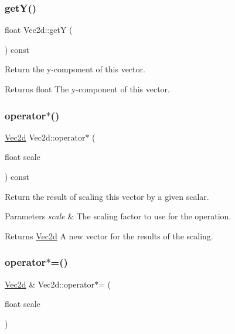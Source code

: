 \subsubsection{\texorpdfstring{get\+Y()}{getY()}}
{\footnotesize\ttfamily float Vec2d\+::getY (\begin{DoxyParamCaption}{ }\end{DoxyParamCaption}) const}



Return the y-\/component of this vector. 

\begin{DoxyReturn}{Returns}
float The y-\/component of this vector. 
\end{DoxyReturn}
\mbox{\label{classVec2d_afe257286ca7b33600929aeca3201adcc}} 
\subsubsection{\texorpdfstring{operator$\ast$()}{operator*()}}
{\footnotesize\ttfamily \hyperlink{classVec2d}{Vec2d} Vec2d\+::operator$\ast$ (\begin{DoxyParamCaption}\item[{float}]{scale }\end{DoxyParamCaption}) const}



Return the result of scaling this vector by a given scalar. 


\begin{DoxyParams}{Parameters}
{\em scale} & The scaling factor to use for the operation. \\
\hline
\end{DoxyParams}
\begin{DoxyReturn}{Returns}
\hyperlink{classVec2d}{Vec2d} A new vector for the results of the scaling. 
\end{DoxyReturn}
\mbox{\label{classVec2d_a463da7526e951b360b61c573cdcbe7c2}} 
\subsubsection{\texorpdfstring{operator$\ast$=()}{operator*=()}}
{\footnotesize\ttfamily \hyperlink{classVec2d}{Vec2d} \& Vec2d\+::operator$\ast$= (\begin{DoxyParamCaption}\item[{float}]{scale }\end{DoxyParamCaption})}




